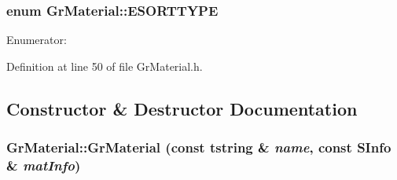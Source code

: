 \begin{CompactItemize}
{\subsubsection[{ESORTTYPE}]{\setlength{\rightskip}{0pt plus 5cm}enum {\bf GrMaterial::ESORTTYPE}}}
\label{class_gr_material_0277ae85793f8cce8f8e3939fb5540e9}


\begin{Desc}
\item[Enumerator: ]\par
\begin{description}
\item[{\em 
\hypertarget{class_gr_material_0277ae85793f8cce8f8e3939fb5540e9436e9e42d8c25cd09c6c644af3555a9d}{
EST\_\-OPAQUE}
\label{class_gr_material_0277ae85793f8cce8f8e3939fb5540e9436e9e42d8c25cd09c6c644af3555a9d}
}]\item[{\em 
\hypertarget{class_gr_material_0277ae85793f8cce8f8e3939fb5540e995e2b6a86e1a95f130349230b2617099}{
EST\_\-DECAL}
\label{class_gr_material_0277ae85793f8cce8f8e3939fb5540e995e2b6a86e1a95f130349230b2617099}
}]\item[{\em 
\hypertarget{class_gr_material_0277ae85793f8cce8f8e3939fb5540e9039f83ee3083c5992195476daad9cfcf}{
EST\_\-ALPHA}
\label{class_gr_material_0277ae85793f8cce8f8e3939fb5540e9039f83ee3083c5992195476daad9cfcf}
}]\end{description}
\end{Desc}



Definition at line 50 of file GrMaterial.h.

\subsection{Constructor \& Destructor Documentation}
\hypertarget{class_gr_material_8bbcfb4cdb8c56150d2b4142619e7b98}{
\subsubsection[{GrMaterial}]{\setlength{\rightskip}{0pt plus 5cm}GrMaterial::GrMaterial (const {\bf tstring} \& {\em name}, \/  const {\bf SInfo} \& {\em matInfo})}}
\label{class_gr_material_8bbcfb4cdb8c56150d2b4142619e7b98}





\end{CompactItemize}
